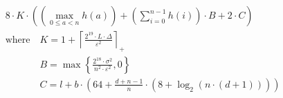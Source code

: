 \[\begin{aligned} &8 \cdot K \cdot \left(\left(\max_{0\le a<n} h\left(a\right)\right) + \left(\sum_{i=0}^{n-1} h\left(i\right)\right) \cdot B + 2 \cdot C\right) \\ &\text{where}\quad K = 1 + \left\lceil \frac{2^{19} \cdot L \cdot \Delta}{\varepsilon^{2}} \right\rceil_{+} \\ &\phantom{\text{where}\quad} B = \max\left\{ \frac{2^{18} \cdot \sigma^{2}}{n^{2} \cdot \varepsilon^{2}}, 0 \right\} \\ &\phantom{\text{where}\quad} C = l + b \cdot \left(64 + \frac{d + n - 1}{n} \cdot \left(8 + \log_{2}\left(n \cdot \left(d + 1\right)\right)\right)\right)\end{aligned}\]
